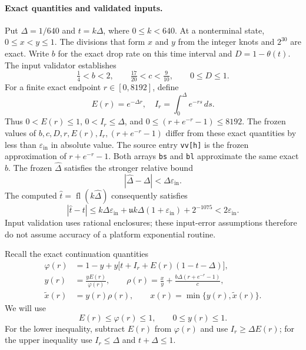 \paragraph{Exact quantities and validated inputs.}
Put $\Delta=1/640$ and $t=k\Delta$, where $0\le k<640$.
At a nonterminal state, $0\le x<y\le1$.
The divisions that form $x$ and $y$ from the integer knots and $2^{30}$
are exact. Write $b$ for the exact drop rate on this time interval and
$D=1-\theta(t)$. The input validator establishes
\[
 \tfrac14<b<2,\qquad \tfrac{17}{20}<c<\tfrac9{10},\qquad
 0\le D\le1.
\]
For a finite exact endpoint $r\in[0,8192]$, define
\[
 E(r)=e^{-\Delta r},\quad
 I_r=\int_0^\Delta e^{-rs}\,ds.
\]
Thus $0<E(r)\le1$, $0<I_r\le\Delta$, and $0\le (r+e^{-r}-1)\le8192$.
The frozen values of $b,c,D,r,E(r),I_r,(r+e^{-r}-1)$ differ from these exact
quantities by less than $\varepsilon_{\mathrm{in}}$ in absolute value.
The source entry \texttt{vv[h]} is the frozen approximation of
$r+e^{-r}-1$. Both arrays \texttt{bs} and \texttt{bl} approximate the same exact $b$.
The frozen $\widehat\Delta$ satisfies the stronger relative bound
\[
 |\widehat\Delta-\Delta|<\Delta\varepsilon_{\mathrm{in}}.
\]
The computed $\widehat t=\operatorname{fl}(k\widehat\Delta)$ consequently
satisfies
\begin{equation}
 |\widehat t-t|
 \le k\Delta\varepsilon_{\mathrm{in}}
   +\mathfrak u k\Delta(1+\varepsilon_{\mathrm{in}})+2^{-1075}
 <2\varepsilon_{\mathrm{in}}.
 \label{eq:certificate-time-error}
\end{equation}
Input validation uses rational enclosures; these input-error assumptions
therefore do not assume accuracy of a platform exponential routine.

Recall the exact continuation quantities
\begin{align*}
 \varphi(r)&=1-y+y\bigl[t+I_r+E(r)(1-t-\Delta)\bigr],\\
 y(r)&=\frac{yE(r)}{\varphi(r)},\qquad
 \rho(r)=\frac{x}{y}+\frac{b\Delta (r+e^{-r}-1)}c,\\
 \widetilde x(r)&=y(r)\rho(r),\qquad
 x(r)=\min\{y(r),\widetilde x(r)\}.
\end{align*}
We will use
\begin{equation}
 E(r)\le\varphi(r)\le1,
 \qquad 0\le y(r)\le1.
 \label{eq:certificate-phi-range}
\end{equation}
For the lower inequality, subtract $E(r)$ from $\varphi(r)$ and use
$I_r\ge\Delta E(r)$; for the upper inequality use
$I_r\le\Delta$ and $t+\Delta\le1$.

